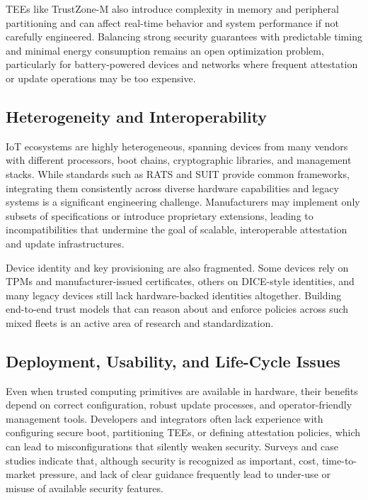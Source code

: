 \documentclass[conference,11pt,a4paper]{IEEEtran}
\begin{document}
TEEs like TrustZone-M also introduce complexity in memory and peripheral partitioning and can affect real-time behavior and system performance if not carefully engineered.\cite{tzm_runtime,tzm_framework} Balancing strong security guarantees with predictable timing and minimal energy consumption remains an open optimization problem, particularly for battery-powered devices and networks where frequent attestation or update operations may be too expensive.\cite{suit_survey,resource_constrained}

\subsection{Heterogeneity and Interoperability}
IoT ecosystems are highly heterogeneous, spanning devices from many vendors with different processors, boot chains, cryptographic libraries, and management stacks.\cite{tcg_iot,ra_survey} While standards such as RATS and SUIT provide common frameworks, integrating them consistently across diverse hardware capabilities and legacy systems is a significant engineering challenge.\cite{rats_arch,suit_arch} Manufacturers may implement only subsets of specifications or introduce proprietary extensions, leading to incompatibilities that undermine the goal of scalable, interoperable attestation and update infrastructures.\cite{tcg_iot,charra_pm}

Device identity and key provisioning are also fragmented. Some devices rely on TPMs and manufacturer-issued certificates, others on DICE-style identities, and many legacy devices still lack hardware-backed identities altogether.\cite{tcg_tpm_iot,tcg_iot} Building end-to-end trust models that can reason about and enforce policies across such mixed fleets is an active area of research and standardization.\cite{rats_arch,resource_constrained}

\subsection{Deployment, Usability, and Life-Cycle Issues}
Even when trusted computing primitives are available in hardware, their benefits depend on correct configuration, robust update processes, and operator-friendly management tools. Developers and integrators often lack experience with configuring secure boot, partitioning TEEs, or defining attestation policies, which can lead to misconfigurations that silently weaken security.\cite{tzm_framework,tcg_iot} Surveys and case studies indicate that, although security is recognized as important, cost, time-to-market pressure, and lack of clear guidance frequently lead to under-use or misuse of available security features.\cite{suit_survey,tcg_iot}
\end{document}
